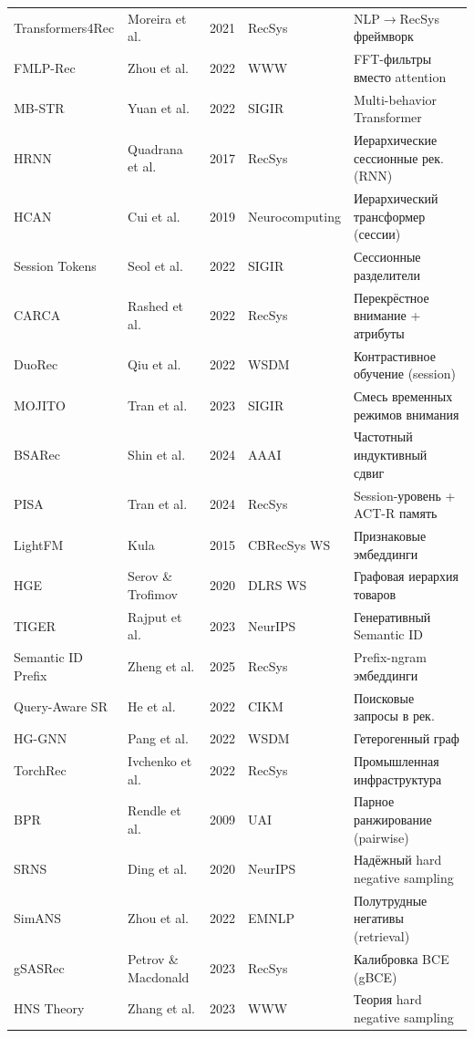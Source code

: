 \begin{longtable}{p{3.5cm} p{3cm} p{1cm} p{2cm} p{4cm}}
    Transformers4Rec & Moreira et al. & 2021 & RecSys & NLP$\to$RecSys фреймворк \\
    FMLP-Rec & Zhou et al. & 2022 & WWW & FFT-фильтры вместо attention \\
    MB-STR & Yuan et al. & 2022 & SIGIR & Multi-behavior Transformer \\
    HRNN & Quadrana et al. & 2017 & RecSys & Иерархические сессионные рек. (RNN) \\
    HCAN & Cui et al. & 2019 & Neurocomputing & Иерархический трансформер (сессии) \\
    Session Tokens & Seol et al. & 2022 & SIGIR & Сессионные разделители \\
    CARCA & Rashed et al. & 2022 & RecSys & Перекрёстное внимание + атрибуты \\
    DuoRec & Qiu et al. & 2022 & WSDM & Контрастивное обучение (session) \\
    MOJITO & Tran et al. & 2023 & SIGIR & Смесь временных режимов внимания \\
    BSARec & Shin et al. & 2024 & AAAI & Частотный индуктивный сдвиг \\
    PISA & Tran et al. & 2024 & RecSys & Session-уровень + ACT-R память \\
    LightFM & Kula & 2015 & CBRecSys WS & Признаковые эмбеддинги \\
    HGE & Serov \& Trofimov & 2020 & DLRS WS & Графовая иерархия товаров \\
    TIGER & Rajput et al. & 2023 & NeurIPS & Генеративный Semantic ID \\
    Semantic ID Prefix & Zheng et al. & 2025 & RecSys & Prefix-ngram эмбеддинги \\
    Query-Aware SR & He et al. & 2022 & CIKM & Поисковые запросы в рек. \\
    HG-GNN & Pang et al. & 2022 & WSDM & Гетерогенный граф \\
    TorchRec & Ivchenko et al. & 2022 & RecSys & Промышленная инфраструктура \\
    BPR & Rendle et al. & 2009 & UAI & Парное ранжирование (pairwise) \\
    SRNS & Ding et al. & 2020 & NeurIPS & Надёжный hard negative sampling \\
    SimANS & Zhou et al. & 2022 & EMNLP & Полутрудные негативы (retrieval) \\
    gSASRec & Petrov \& Macdonald & 2023 & RecSys & Калибровка BCE (gBCE) \\
    HNS Theory & Zhang et al. & 2023 & WWW & Теория hard negative sampling \\

\end{longtable}
